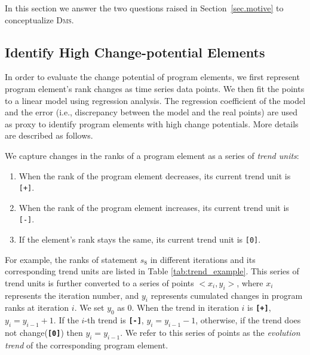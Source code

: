 

In this section we answer the two questions raised in Section~\ref{sec.motive} to conceptualize \textsc{Dms}.

\subsection{Identify High Change-potential Elements}

In order to evaluate the change potential of program elements, we first represent program element's rank changes as time series data points. We then fit the points to a linear model using regression analysis. The regression coefficient of the model and the error (i.e., discrepancy between the model and the real points) are used as proxy to identify program elements with high change potentials. More details are described as follows.

\vspace{0.2cm}
 We capture changes in the ranks of a program element as a series of {\em trend units}:

\begin{enumerate}
    \setlength{\itemsep}{3pt}%
	\item When the rank of the program element decreases, its current trend unit is \texttt{[+]}.
	\item When the rank of the program element increases, its current trend unit is \texttt{[-]}.
	\item If the element's rank stays the same, its current trend unit is \texttt{[0]}.
\end{enumerate}

For example, the ranks of statement $s_{8}$ in different iterations and its corresponding trend units are listed in Table \ref{tab:trend_example}. This series of trend units is further converted to a series of points $<x_{i},y_{i}>$, where $x_{i}$ represents the iteration number, and $y_{i}$ represents cumulated changes in program ranks at iteration $i$. We set $y_{0}$ as 0. When the trend in iteration $i$ is {\bf \texttt{[+]}}, $y_{i} = y_{i-1} + 1$.
If the $i$-th trend is {\bf \texttt{[-]}}, $y_{i} = y_{i-1} - 1$, otherwise, if the trend does not change({\bf \texttt{[0]}}) then $y_{i} = y_{i-1}$. We refer to this series of points as the {\em evolution trend} of the corresponding program element.

